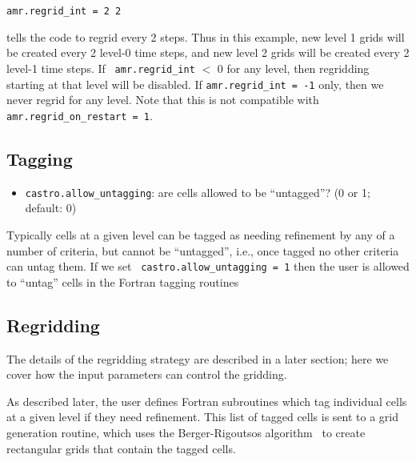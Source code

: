 \begin{lstlisting}
amr.regrid_int = 2 2
\end{lstlisting}
tells the code to regrid every 2 steps.  Thus in this example, new
level 1 grids will be created every 2 level-0 time steps, and new
level 2 grids will be created every 2 level-1 time steps. If {\tt
amr.regrid\_int} $<$ 0 for any level, then regridding starting at that
level will be disabled. If {\tt amr.regrid\_int = -1} only, then we
never regrid for any level. Note that this is not compatible with {\tt
amr.regrid\_on\_restart = 1}.


\subsection{Tagging}

\begin{itemize}
\item {\tt castro.allow\_untagging}: are cells allowed to be ``untagged''? (0 or 1; default: 0)
\end{itemize}

Typically cells at a given level can be tagged as needing refinement
by any of a number of criteria, but cannot be ``untagged'', i.e., once
tagged no other criteria can untag them.  If we set {\tt
castro.allow\_untagging = 1} then the user is allowed to ``untag'' cells
in the Fortran tagging routines


\subsection{Regridding}

The details of the regridding strategy are described in a later section; here we 
cover how the input parameters can control the gridding.

As described later, the user defines Fortran subroutines which tag individual
cells at a given level if they need refinement.  This list of tagged cells is
sent to a grid generation routine, which uses the Berger-Rigoutsos algorithm~\cite{br-refine}
to create rectangular grids that contain the tagged cells.   

